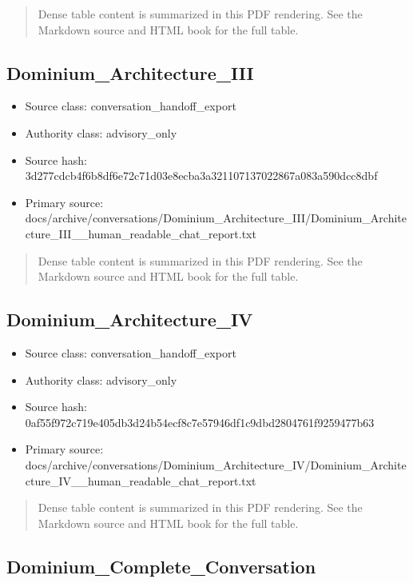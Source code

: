 \documentclass[11pt,a4paper]{report}
\begin{document}
\begin{quote}\small Dense table content is summarized in this PDF rendering. See the Markdown source and HTML book for the full table.\end{quote}

\subsection{Dominium\_Architecture\_III}

\begin{itemize}
\item Source class: conversation\_handoff\_export
\item Authority class: advisory\_only
\item Source hash: 3d277cdcb4f6b8df6e72c71d03e8ecba3a321107137022867a083a590dcc8dbf
\item Primary source: docs/archive/conversations/Dominium\_Architecture\_III/Dominium\_Architecture\_III\_\_human\_readable\_chat\_report.txt
\end{itemize}

\begin{quote}\small Dense table content is summarized in this PDF rendering. See the Markdown source and HTML book for the full table.\end{quote}

\subsection{Dominium\_Architecture\_IV}

\begin{itemize}
\item Source class: conversation\_handoff\_export
\item Authority class: advisory\_only
\item Source hash: 0af55f972c719e405db3d24b54ecf8c7e57946df1c9dbd2804761f9259477b63
\item Primary source: docs/archive/conversations/Dominium\_Architecture\_IV/Dominium\_Architecture\_IV\_\_human\_readable\_chat\_report.txt
\end{itemize}

\begin{quote}\small Dense table content is summarized in this PDF rendering. See the Markdown source and HTML book for the full table.\end{quote}

\subsection{Dominium\_Complete\_Conversation}
\end{document}
